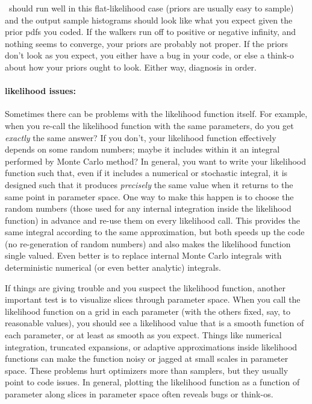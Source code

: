 \documentclass[modern]{aastex61}
\newcommand{\MCMC}{\acronym{MCMC}}
\begin{document}
\MCMC\ should run well in this flat-likelihood case (priors are usually easy to sample)
  and the output sample histograms should look like what you expect
  given the prior pdfs you coded.
If the walkers run off to positive or negative infinity,
  and nothing seems to converge,
  your priors are probably not proper.
If the priors don't look as you expect,
  you either have a bug in your code,
  or else a think-o about how your priors ought to look.
Either way, diagnosis in order.

\paragraph{likelihood issues:}
Sometimes there can be problems with the likelihood function itself.
For example,
  when you re-call the likelihood function with the same parameters,
  do you get \emph{exactly} the same answer?
If you don't, your likelihood function effectively depends on some random numbers;
  maybe it includes within it an integral performed by Monte Carlo method?
In general, you want to write your likelihood function such that,
  even if it includes a numerical or stochastic integral,
  it is designed such that it produces \emph{precisely} the same
  value when it returns to the same point in parameter space.
One way to make this happen is to choose the random numbers
  (those used for any internal integration inside the likelihood function)
  in advance and re-use them on every likelihood call.
This provides the same integral according to the same approximation,
  but both speeds up the code (no re-generation of random numbers)
  and also makes the likelihood function single valued.
Even better is to replace internal Monte Carlo integrals with
  deterministic numerical (or even better analytic) integrals.

If things are giving trouble and you suspect the likelihood function,
  another important test is to visualize slices through parameter space.
When you call the likelihood function on a grid in each parameter
  (with the others fixed, say, to reasonable values),
  you should see a likelihood value that is a smooth function of each parameter,
  or at least as smooth as you expect.
Things like numerical integration,
  truncated expansions,
  or adaptive approximations
  inside likelihood functions
  can make the function noisy or jagged at small scales in parameter space.
These problems hurt optimizers more than samplers,
  but they usually point to code issues.
In general, plotting the likelihood function as a function of parameter along
  slices in parameter space often reveals bugs or think-os.
\end{document}

